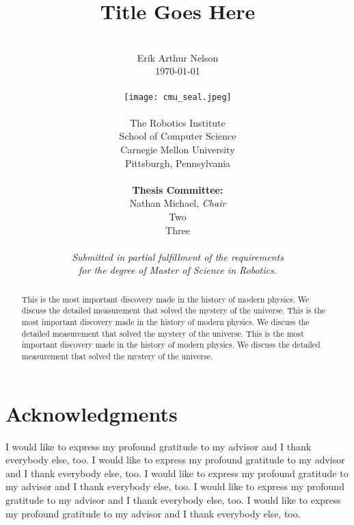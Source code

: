 \documentclass[12pt,twoside]{report}
\author{
  \\
  Erik Arthur Nelson \\
  \today \\
  \\
  \texttt{[image: cmu\_seal.jpeg]} \\
  \\
  The Robotics Institute \\
  School of Computer Science \\
  Carnegie Mellon University \\
  Pittsburgh, Pennsylvania \\
  \\
  {\bf Thesis Committee:} \\
  Nathan Michael, {\it Chair} \\
  Two \\
  Three \\
  \\
  \textit{Submitted in partial fulfillment of the requirements} \\
  \textit{for the degree of Master of Science in Robotics.}
}
\title{\bf{
Title Goes Here
}}
\date{}
\begin{document}
\thispagestyle{empty}

\maketitle


\thispagestyle{empty} \cleardoublepage

%
%
%
\begin{abstract}

  This is the most important discovery made in the history of modern
  physics. We discuss the detailed measurement that solved the mystery
  of the universe.  This is the most important discovery made in the
  history of modern physics. We discuss the detailed measurement that
  solved the mystery of the universe.  This is the most important
  discovery made in the history of modern physics. We discuss the
  detailed measurement that solved the mystery of the universe.

\end{abstract}

\thispagestyle{empty} \cleardoublepage


%
%
%
\section*{Acknowledgments}

I would like to express my profound gratitude to my advisor and I thank
everybody else, too.  I would like to express my profound gratitude to
my advisor and I thank everybody else, too.  I would like to express my
profound gratitude to my advisor and I thank everybody else, too.  I
would like to express my profound gratitude to my advisor and I thank
everybody else, too.  I would like to express my profound gratitude to
my advisor and I thank everybody else, too.
\end{document}
